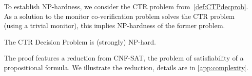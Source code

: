 \documentclass[runningheads]{llncs}
\newcommand{\appcite}[2]{#2} %
\begin{document}
To establish NP-hardness, we consider the CTR problem from~\cref{def:CTPdecprob}. As a solution to the monitor co-verification problem solves the CTR problem (using a trivial monitor), this implies NP-hardness of the former problem.
\begin{lemma}
    \label{lem:ctpdecnphard}
    The CTR Decision Problem is (strongly) NP-hard.
\end{lemma}
The proof features a reduction from CNF-SAT, the problem of satisfiability of a propositional formula. We illustrate the reduction, details are in \appcite{\cite[App. B]{TR}}{\cref{app:complexity}}.

\end{document}

